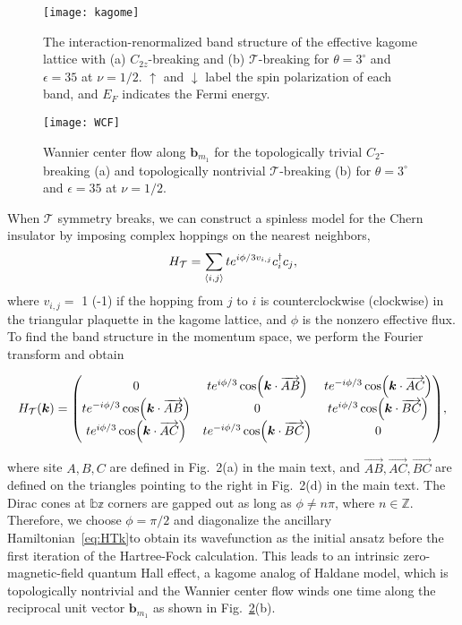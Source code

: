\documentclass[aps,prl,floatfix,twocolumn]{revtex4-1}
\begin{document}
\begin{figure}[t]
	\centering
	\texttt{[image: kagome]}
	\caption{The interaction-renormalized band structure of the effective kagome lattice with (a) $ C_{2z} $-breaking and (b) $ \mathcal{T} $-breaking for $ \theta=3^\circ $ and $ \epsilon=35 $ at $ \nu=1/2 $. $\uparrow$ and $\downarrow$ label the spin polarization of each band, and $E_F$ indicates the Fermi energy.}
	\label{fig:kagome}
\end{figure}
\begin{figure}[t]
	\centering
	\texttt{[image: WCF]}
	\caption{Wannier center flow along $ \bm{b}_{m_1} $ for the topologically trivial $ C_2 $-breaking (a) and topologically nontrivial $ \mathcal{T} $-breaking (b) for $ \theta=3^\circ $ and $ \epsilon=35 $ at $ \nu=1/2 $.}
	\label{fig:WCF}
\end{figure}


When $ \mathcal{T} $ symmetry breaks, we can construct a spinless model for the Chern insulator by imposing complex hoppings on the nearest neighbors,
\begin{equation}\label{eq:HT}
	H_{\mathcal{T}}=\sum_{\expval{i,j}} t e^{i\phi/3 v_{i,j}} c_i^\dagger c_j,
\end{equation}
where $ v_{i,j}= $ 1 (-1) if the hopping from $ j $ to $ i $ is counterclockwise (clockwise) in the triangular plaquette in the kagome lattice, and $ \phi $ is the nonzero effective flux. To find the band structure in the momentum space, we perform the Fourier transform and obtain
\begin{widetext}
	\begin{equation}\label{eq:HTk}
		H_{\mathcal{T}}(\bm{k})=\mqty(0 & t e^{i\phi/3}\cos(\bm{k}\cdot\overrightarrow{AB}) & t e^{-i\phi/3}\cos(\bm{k}\cdot\overrightarrow{AC})\\
		t e^{-i\phi/3}\cos(\bm{k}\cdot\overrightarrow{AB}) & 0 & t e^{i\phi/3}\cos(\bm{k}\cdot\overrightarrow{BC})\\
		t e^{i\phi/3}\cos(\bm{k}\cdot\overrightarrow{AC}) & t e^{-i\phi/3}\cos(\bm{k}\cdot\overrightarrow{BC}) & 0
		),
	\end{equation}
\end{widetext}

where site $ A,B,C $ are defined in Fig.~2(a) in the main text, and $ \overrightarrow{AB},\overrightarrow{AC},\overrightarrow{BC} $ are defined on the triangles pointing to the right in Fig.~2(d) in the main text. The Dirac cones at $ \mathbb{bz} $ corners are gapped out as long as $ \phi\neq n\pi $, where $ n\in\mathbb{Z} $. Therefore, we choose $ \phi=\pi/2 $ and diagonalize the ancillary Hamiltonian~\eqref{eq:HTk}to obtain its wavefunction as the initial ansatz before the first iteration of the Hartree-Fock calculation. This leads to an intrinsic zero-magnetic-field quantum Hall effect, a kagome analog of Haldane model, which is topologically nontrivial and the Wannier center flow winds one time along the reciprocal unit vector $ \bm{b}_{m_1} $ as shown in Fig.~\ref{fig:WCF}(b). 
\end{document}
